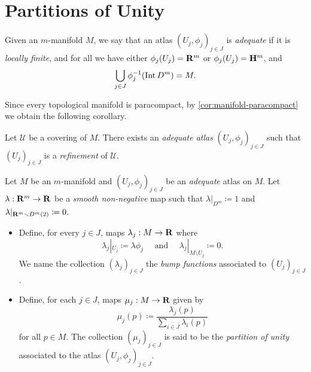 \section{Partitions of Unity}

\begin{definition}
    \label{def:adequate-atlas}
    Given an \(m\)-manifold \(M\), we say that an atlas
    \((U_j, \phi_j)_{j \in J}\) is \emph{adequate} if it is \emph{locally
        finite}, and for all we have either \(\phi_j(U_j) = \mathbf{R}^m\) or
    \(\phi_j(U_j) = \mathbf{H}^m\), and
    \[
        \bigcup_{j \in J} \phi_j^{-1}(\operatorname{Int} D^m) = M.
    \]
\end{definition}

Since every topological manifold is paracompact, by
\cref{cor:manifold-paracompact} we obtain the following corollary.

\begin{corollary}
    \label{cor:refinement-adequate-atlas}
    Let \(\mathcal{U}\) be a covering of \(M\). There exists an \emph{adequate
        atlas} \((U_j, \phi_j)_{j \in J}\) such that \((U_j)_{j \in J}\) is
    a \emph{refinement} of \(\mathcal{U}\).
\end{corollary}

\begin{definition}
    \label{def:}
    Let \(M\) be an \(m\)-manifold and \((U_{j}, \phi_j)_{j \in J}\) be an
    \emph{adequate} atlas on \(M\). Let \(\lambda: \mathbf{R}^m \to \mathbf{R}\) be a \emph{smooth
        non-negative} map such that \(\lambda|_{D^m} \coloneq 1\) and
    \(\lambda|_{\mathbf{R}^m \smallsetminus D^m(2)} \coloneq 0\).
    \begin{itemize}\setlength\itemsep{0em}
        \item Define, for every \(j \in J\), maps \(\lambda_j: M \to \mathbf{R}\) where
              \[
                  \lambda_j|_{U_j} \coloneq \lambda \phi_j
                  \quad\text{ and }\quad
                  \lambda_j|_{M \setminus U_j} \coloneq 0.
              \]
              We name the collection \((\lambda_j)_{j \in J}\) the \emph{bump functions}
              associated to \((U_j)_{j \in J}\).
        \item Define, for each \(j \in J\), maps \(\mu_j: M \to \mathbf{R}\) given by
              \[
                  \mu_j(p) \coloneq \frac{\lambda_j(p)}{\sum_{i \in J} \lambda_i(p)}
              \]
              for all \(p \in M\). The collection \((\mu_j)_{j \in J}\) is said to be the
              \emph{partition of unity} associated to the atlas \((U_j, \phi_j)_{j \in J}\).
    \end{itemize}
\end{definition}


